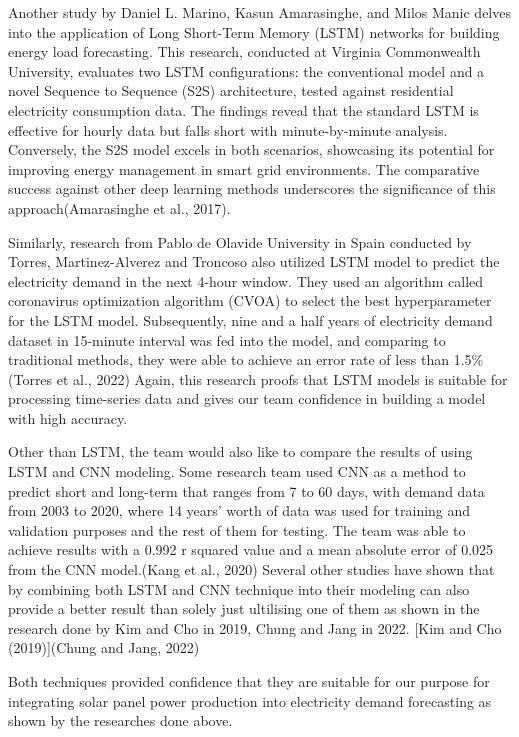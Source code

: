 \documentclass[
]{article}
\begin{document}
Another study by Daniel L. Marino, Kasun Amarasinghe, and Milos Manic
delves into the application of Long Short-Term Memory (LSTM) networks
for building energy load forecasting. This research, conducted at
Virginia Commonwealth University, evaluates two LSTM configurations: the
conventional model and a novel Sequence to Sequence (S2S) architecture,
tested against residential electricity consumption data. The findings
reveal that the standard LSTM is effective for hourly data but falls
short with minute-by-minute analysis. Conversely, the S2S model excels
in both scenarios, showcasing its potential for improving energy
management in smart grid environments. The comparative success against
other deep learning methods underscores the significance of this
approach(Amarasinghe et al., 2017).

Similarly, research from Pablo de Olavide University in Spain conducted
by Torres, Martinez-Alverez and Troncoso also utilized LSTM model to
predict the electricity demand in the next 4-hour window. They used an
algorithm called coronavirus optimization algorithm (CVOA) to select the
best hyperparameter for the LSTM model. Subsequently, nine and a half
years of electricity demand dataset in 15-minute interval was fed into
the model, and comparing to traditional methods, they were able to
achieve an error rate of less than 1.5\% (Torres et al., 2022) Again,
this research proofs that LSTM models is suitable for processing
time-series data and gives our team confidence in building a model with
high accuracy.

Other than LSTM, the team would also like to compare the results of
using LSTM and CNN modeling. Some research team used CNN as a method to
predict short and long-term that ranges from 7 to 60 days, with demand
data from 2003 to 2020, where 14 years' worth of data was used for
training and validation purposes and the rest of them for testing. The
team was able to achieve results with a 0.992 r squared value and a mean
absolute error of 0.025 from the CNN model.(Kang et al., 2020) Several
other studies have shown that by combining both LSTM and CNN technique
into their modeling can also provide a better result than solely just
ultilising one of them as shown in the research done by Kim and Cho in
2019, Chung and Jang in 2022. {[}Kim and Cho (2019){]}(Chung and Jang,
2022)

Both techniques provided confidence that they are suitable for our
purpose for integrating solar panel power production into electricity
demand forecasting as shown by the researches done above.
\end{document}
